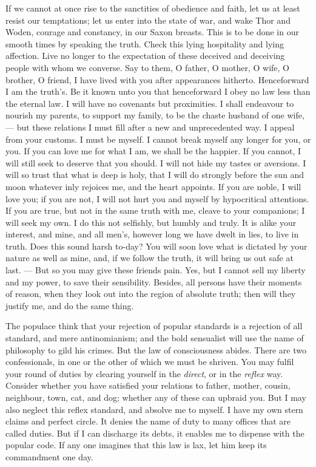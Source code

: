 \documentclass[12pt]{article}
\begin{document}
If we cannot at once rise to the sanctities of obedience and faith, let us
at least resist our temptations; let us enter into the state of war, and
wake Thor and Woden, courage and constancy, in our Saxon breasts. This is to
be done in our smooth times by speaking the truth. Check this lying
hospitality and lying affection. Live no longer to the expectation of these
deceived and deceiving people with whom we converse. Say to them, O father,
O mother, O wife, O brother, O friend, I have lived with you after
appearances hitherto. Henceforward I am the truth's. Be it known unto you
that henceforward I obey no law less than the eternal law. I will have no
covenants but proximities. I shall endeavour to nourish my parents, to
support my family, to be the chaste husband of one wife, --- but these
relations I must fill after a new and unprecedented way. I appeal from your
customs. I must be myself. I cannot break myself any longer for you, or you.
If you can love me for what I am, we shall be the happier. If you cannot, I
will still seek to deserve that you should. I will not hide my tastes or
aversions. I will so trust that what is deep is holy, that I will do
strongly before the sun and moon whatever inly rejoices me, and the heart
appoints. If you are noble, I will love you; if you are not, I will not hurt
you and myself by hypocritical attentions. If you are true, but not in the
same truth with me, cleave to your companions; I will seek my own. I do this
not selfishly, but humbly and truly. It is alike your interest, and mine,
and all men's, however long we have dwelt in lies, to live in truth. Does
this sound harsh to-day? You will soon love what is dictated by your nature
as well as mine, and, if we follow the truth, it will bring us out safe at
last. --- But so you may give these friends pain. Yes, but I cannot sell my
liberty and my power, to save their sensibility. Besides, all persons have
their moments of reason, when they look out into the region of absolute
truth; then will they justify me, and do the same thing.

The populace think that your rejection of popular standards is a rejection
of all standard, and mere antinomianism; and the bold sensualist will use
the name of philosophy to gild his crimes. But the law of consciousness
abides. There are two confessionals, in one or the other of which we must be
shriven. You may fulfil your round of duties by clearing yourself in the
{\it direct}, or in the {\it reflex} way. Consider whether you
have satisfied your
relations to father, mother, cousin, neighbour, town, cat, and dog; whether
any of these can upbraid you. But I may also neglect this reflex standard,
and absolve me to myself. I have my own stern claims and perfect circle. It
denies the name of duty to many offices that are called duties. But if I can
discharge its debts, it enables me to dispense with the popular code. If any
one imagines that this law is lax, let him keep its commandment one day.
\end{document}
